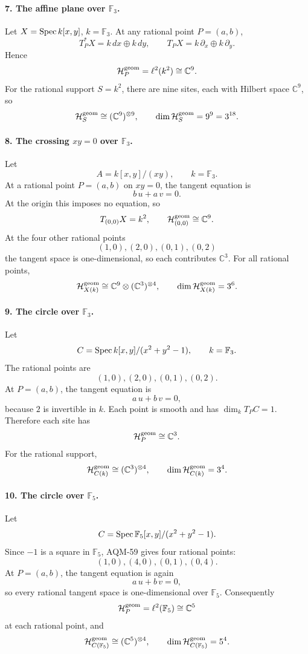 \paragraph{7. The affine plane over \(\mathbb F_3\).}
Let \(X=\operatorname{Spec} k[x,y]\), \(k=\mathbb F_3\).  At any rational point \(P=(a,b)\),
\[
  T_P^*X=k\,dx\oplus k\,dy,\qquad
  T_PX=k\,\partial_x\oplus k\,\partial_y.
\]
Hence
\[
  \mathcal H_P^{\rm geom}=\ell^2(k^2)\cong\mathbb C^9.
\]
For the rational support \(S=k^2\), there are nine sites, each with Hilbert
space \(\mathbb C^9\), so
\[
  \mathcal H_S^{\rm geom}\cong(\mathbb C^9)^{\otimes9},
  \qquad \dim\mathcal H_S^{\rm geom}=9^9=3^{18}.
\]

\paragraph{8. The crossing \(xy=0\) over \(\mathbb F_3\).}
Let
\[
  A=k[x,y]/(xy),\qquad k=\mathbb F_3.
\]
At a rational point \(P=(a,b)\) on \(xy=0\), the tangent equation is
\[
  b\,u+a\,v=0.
\]
At the origin this imposes no equation, so
\[
  T_{(0,0)}X=k^2,\qquad
  \mathcal H_{(0,0)}^{\rm geom}\cong\mathbb C^9.
\]
At the four other rational points
\[
  (1,0),(2,0),(0,1),(0,2)
\]
the tangent space is one-dimensional, so each contributes \(\mathbb C^3\).
For all rational points,
\[
  \mathcal H_{X(k)}^{\rm geom}\cong
  \mathbb C^9\otimes(\mathbb C^3)^{\otimes4},
  \qquad \dim\mathcal H_{X(k)}^{\rm geom}=3^6.
\]

\paragraph{9. The circle over \(\mathbb F_3\).}
Let
\[
  C=\operatorname{Spec} k[x,y]/(x^2+y^2-1),\qquad k=\mathbb F_3.
\]
The rational points are
\[
  (1,0),(2,0),(0,1),(0,2).
\]
At \(P=(a,b)\), the tangent equation is
\[
  a\,u+b\,v=0,
\]
because \(2\) is invertible in \(k\).  Each point is smooth and has
\(\dim_kT_PC=1\).  Therefore each site has
\[
  \mathcal H_P^{\rm geom}\cong\mathbb C^3.
\]
For the rational support,
\[
  \mathcal H_{C(k)}^{\rm geom}\cong(\mathbb C^3)^{\otimes4},
  \qquad \dim\mathcal H_{C(k)}^{\rm geom}=3^4.
\]

\paragraph{10. The circle over \(\mathbb F_5\).}
Let
\[
  C=\operatorname{Spec} \mathbb F_5[x,y]/(x^2+y^2-1).
\]
Since \(-1\) is a square in \(\mathbb F_5\), AQM-59 gives four rational points:
\[
  (1,0),(4,0),(0,1),(0,4).
\]
At \(P=(a,b)\), the tangent equation is again
\[
  a\,u+b\,v=0,
\]
so every rational tangent space is one-dimensional over \(\mathbb F_5\).
Consequently
\[
  \mathcal H_P^{\rm geom}=\ell^2(\mathbb F_5)\cong\mathbb C^5
\]
at each rational point, and
\[
  \mathcal H_{C(\mathbb F_5)}^{\rm geom}
  \cong(\mathbb C^5)^{\otimes4},\qquad
  \dim\mathcal H_{C(\mathbb F_5)}^{\rm geom}=5^4.
\]

